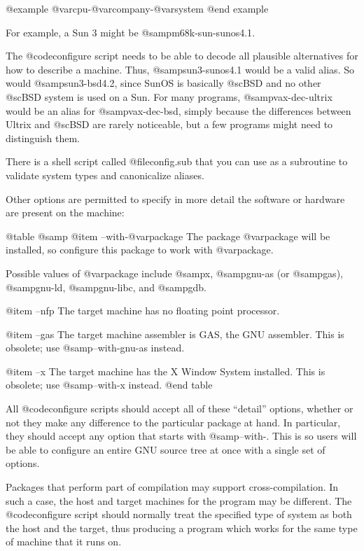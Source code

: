 @example
@var{cpu}-@var{company}-@var{system}
@end example

For example, a Sun 3 might be @samp{m68k-sun-sunos4.1}.

The @code{configure} script needs to be able to decode all plausible
alternatives for how to describe a machine.  Thus, @samp{sun3-sunos4.1}
would be a valid alias.  So would @samp{sun3-bsd4.2}, since SunOS is
basically @sc{BSD} and no other @sc{BSD} system is used on a Sun.  For many
programs, @samp{vax-dec-ultrix} would be an alias for
@samp{vax-dec-bsd}, simply because the differences between Ultrix and
@sc{BSD} are rarely noticeable, but a few programs might need to distinguish
them.

There is a shell script called @file{config.sub} that you can use
as a subroutine to validate system types and canonicalize aliases.

Other options are permitted to specify in more detail the software
or hardware are present on the machine:

@table @samp
@item --with-@var{package}
The package @var{package} will be installed, so configure this package
to work with @var{package}.

Possible values of @var{package} include @samp{x}, @samp{gnu-as} (or
@samp{gas}), @samp{gnu-ld}, @samp{gnu-libc}, and @samp{gdb}.

@item --nfp
The target machine has no floating point processor.

@item --gas
The target machine assembler is GAS, the GNU assembler.
This is obsolete; use @samp{--with-gnu-as} instead.

@item --x
The target machine has the X Window System installed.
This is obsolete; use @samp{--with-x} instead.
@end table

All @code{configure} scripts should accept all of these ``detail''
options, whether or not they make any difference to the particular
package at hand.  In particular, they should accept any option that
starts with @samp{--with-}.  This is so users will be able to configure
an entire GNU source tree at once with a single set of options.

Packages that perform part of compilation may support cross-compilation.
In such a case, the host and target machines for the program may be
different.  The @code{configure} script should normally treat the
specified type of system as both the host and the target, thus producing
a program which works for the same type of machine that it runs on.


